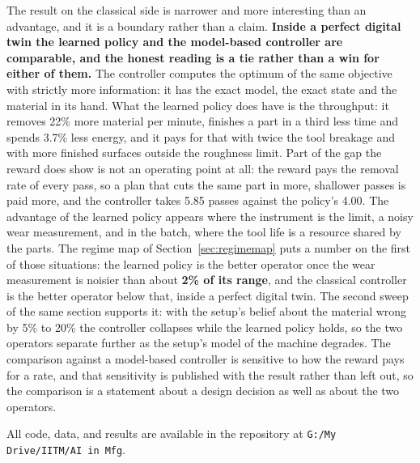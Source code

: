 \documentclass[11pt,a4paper]{article}
\newcommand{\alert}[1]{\textcolor{IITGold}{\textbf{#1}}}
\begin{document}
The result on the classical side is narrower and more interesting than an advantage, and it is a boundary rather than a claim. \textbf{Inside a perfect digital twin the learned policy and the model-based controller are comparable, and the honest reading is a tie rather than a win for either of them.} The controller computes the optimum of the same objective with strictly more information: it has the exact model, the exact state and the material in its hand. What the learned policy does have is the throughput: it removes 22\% more material per minute, finishes a part in a third less time and spends 3.7\% less energy, and it pays for that with twice the tool breakage and with more finished surfaces outside the roughness limit. Part of the gap the reward does show is not an operating point at all: the reward pays the removal rate of every pass, so a plan that cuts the same part in more, shallower passes is paid more, and the controller takes 5.85 passes against the policy's 4.00. The advantage of the learned policy appears where the instrument is the limit, a noisy wear measurement, and in the batch, where the tool life is a resource shared by the parts. The regime map of Section~\ref{sec:regimemap} puts a number on the first of those situations: the learned policy is the better operator once the wear measurement is noisier than about \alert{2\% of its range}, and the classical controller is the better operator below that, inside a perfect digital twin. The second sweep of the same section supports it: with the setup's belief about the material wrong by 5\% to 20\% the controller collapses while the learned policy holds, so the two operators separate further as the setup's model of the machine degrades. The comparison against a model-based controller is sensitive to how the reward pays for a rate, and that sensitivity is published with the result rather than left out, so the comparison is a statement about a design decision as well as about the two operators.

All code, data, and results are available in the repository at \texttt{G:/My Drive/IITM/AI in Mfg}.

\end{document}
